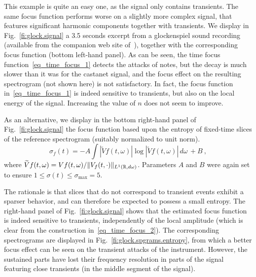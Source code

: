 This example is quite an easy one, as the signal only contains transients. The same focus function performs worse on a slightly more complex signal, that features significant harmonic components together with transients. We display in Fig.~\ref{fi:glock.signal} a 3.5 seconds excerpt from a glockenspiel sound recording (available from the companion web site of~\cite{Jaillet2007time}), together with the corresponding focus function (bottom left-hand panel). As can be seen, the time focus function~\eqref{eq_time_focus_1} detects the attacks of notes, but the decay is much slower than it was for the castanet signal, and the focus effect on the resulting spectrogram (not shown here) is not satisfactory. In fact, the focus function in~\eqref{eq_time_focus_1} is indeed sensitive to transients, but also on the local energy of the signal. Increasing the value of $n$ does not seem to improve.


As an alternative, we display in the bottom right-hand panel of Fig.~\ref{fi:glock.signal} the focus function based upon the entropy of fixed-time slices of the reference spectrogram (suitably normalized to unit norm).
\begin{equation}
\label{eq_time_focus_2}
    \sigma_f(t) = - A \int |\widetilde V f(t,\omega)| \log |\widetilde V f(t,\omega)|\, d\omega\,+B\ ,
\end{equation}
where $\widetilde V f(t,\omega) = Vf(t,\omega)/\|V_f(t,\cdot)\|_{L^1(\mathbb{R},d\omega)}$. Parameters $A$ and $B$ were again set to ensure $1\le\sigma(t)\le\sigma_\text{max}=5$.

The rationale is that slices that do not correspond to transient events exhibit a sparser behavior, and can therefore be expected to possess a small entropy. The right-hand panel of Fig.~\ref{fi:glock.signal} shows that the estimated focus function is indeed sensitive to transients, independently of the local amplitude (which is clear from the construction in~\eqref{eq_time_focus_2}).
The corresponding spectrograms are displayed in Fig.~\ref{fi:glock.spgrams.entropy}, from which a better focus effect can be seen on the transient attacks of the instrument. However, the sustained parts have lost their frequency resolution in parts of the signal featuring close transients (in the middle segment of the signal).

